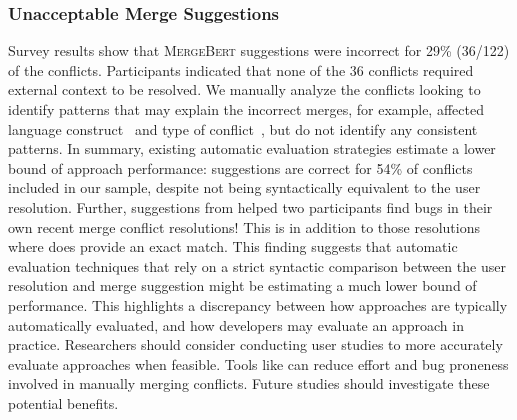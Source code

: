 \subsubsection{Unacceptable Merge Suggestions}
Survey results show that \textsc{MergeBert} suggestions were incorrect for 29\% (36/122) of the conflicts. Participants indicated that none of the 36 conflicts required external context to be resolved. We manually analyze the conflicts looking to identify patterns that may explain the incorrect merges, for example, affected language construct~\cite{pan2021ProgramSynthesis} and type of conflict~\cite{shen2021automatic}, but do not identify any consistent patterns. 
In summary, existing automatic evaluation strategies estimate a lower bound of approach performance: \thistool{} suggestions are correct for 54\% of conflicts included in our sample, despite not being syntactically equivalent to the user resolution.  Further, suggestions from \thistool{} helped two participants find bugs in their own recent merge conflict resolutions!  This is in addition to those resolutions where \thistool{} does provide an exact match.  This finding suggests that automatic evaluation techniques that rely on a strict syntactic comparison between the user resolution and merge suggestion might be estimating a much lower bound of performance. This highlights a discrepancy between how approaches are typically automatically evaluated, and how developers may evaluate an approach in practice.  Researchers should consider conducting user studies to more accurately evaluate approaches when feasible. 
 Tools like \thistool{} can reduce effort and bug proneness involved in manually merging conflicts. Future studies should investigate these potential benefits. 
